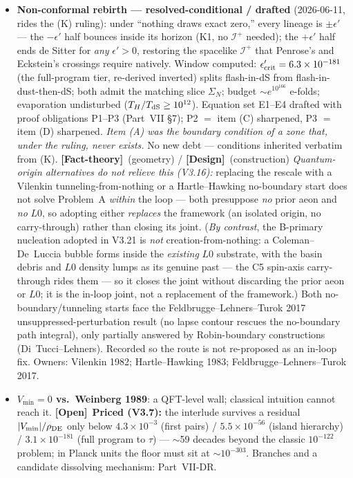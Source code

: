 \documentclass[11pt]{article}
\newcommand{\factth}{\textcolor{green!40!black}{\textbf{[Fact-theory]}}}
\newcommand{\design}{\textcolor{blue!60!black}{\textbf{[Design]}}}
\newcommand{\open}{\textcolor{red!70!black}{\textbf{[Open]}}}
\begin{document}
\begin{itemize}[leftmargin=2.6em,itemsep=3pt]
\item[\textbf{(A)}] \textbf{Non-conformal rebirth --- resolved-conditional / drafted} (2026-06-11, rides the (K) ruling): under ``nothing draws exact zero,'' every lineage is $\pm\epsilon'$ --- the $-\epsilon'$ half bounces inside its horizon (K1, no $\mathscr I^+$ needed); the $+\epsilon'$ half ends de Sitter for \emph{any} $\epsilon'>0$, restoring the spacelike $\mathscr I^+$ that Penrose's and Eckstein's crossings require natively. Window computed: $\epsilon'_{\rm crit}=6.3\times10^{-181}$ (the full-program tier, re-derived inverted) splits flash-in-dS from flash-in-dust-then-dS; both admit the matching slice $\Sigma_N$; budget $\sim e^{10^{166}}$ e-folds; evaporation undisturbed ($T_H/T_{\rm dS}\ge10^{12}$). Equation set E1--E4 drafted with proof obligations P1--P3 (Part~VII \S7); P2 $=$ item (C) sharpened, P3 $=$ item (D) sharpened. \emph{Item (A) was the boundary condition of a zone that, under the ruling, never exists.} No new debt --- conditions inherited verbatim from (K). \factth\ (geometry) / \design\ (construction) \emph{Quantum-origin alternatives do not relieve this (V3.16):} replacing the rescale with a Vilenkin tunneling-from-nothing or a Hartle--Hawking no-boundary start does not solve Problem~A \emph{within} the loop --- both presuppose \emph{no} prior aeon and \emph{no} $L0$, so adopting either \emph{replaces} the framework (an isolated origin, no carry-through) rather than closing its joint. (\emph{By contrast}, the B-primary nucleation adopted in V3.21 is \emph{not} creation-from-nothing: a Coleman--De~Luccia bubble forms inside the \emph{existing} $L0$ substrate, with the basin debris and $L0$ density lumps as its genuine past --- the C5 spin-axis carry-through rides them --- so it closes the joint without discarding the prior aeon or $L0$; it is the in-loop joint, not a replacement of the framework.) Both no-boundary/tunneling starts face the Feldbrugge--Lehners--Turok 2017 unsuppressed-perturbation result (no lapse contour rescues the no-boundary path integral), only partially answered by Robin-boundary constructions (Di~Tucci--Lehners). Recorded so the route is not re-proposed as an in-loop fix. Owners: Vilenkin 1982; Hartle--Hawking 1983; Feldbrugge--Lehners--Turok 2017.
\item[\textbf{(B)}] \textbf{$V_{\min}=0$ vs.\ Weinberg 1989}: a QFT-level wall; classical intuition cannot reach it. \open\ \textbf{Priced (V3.7):} the interlude survives a residual $|V_{\min}|/\rho_{\rm DE}$ only below $4.3\times10^{-3}$ (first pairs) / $5.5\times10^{-56}$ (island hierarchy) / $3.1\times10^{-181}$ (full program to $\tau$) --- $\sim$59 decades beyond the classic $10^{-122}$ problem; in Planck units the floor must sit at $\sim10^{-303}$. Branches and a candidate dissolving mechanism: Part~VII-DR.

\end{itemize}
\end{document}
